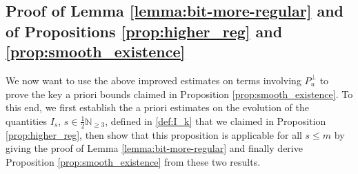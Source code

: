 \documentclass[10pt,reqno]{amsart}
\theoremstyle{plain}
\theoremstyle{definition}
\numberwithin{equation}{section}
\newcommand{\N}{\ensuremath{{\mathbb N}}}
\newcommand{\half}{\frac{1}{2}}
\begin{document}
\subsection{Proof of Lemma \ref{lemma:bit-more-regular} and of 
Propositions \ref{prop:higher_reg} and \ref{prop:smooth_existence}}\label{subsec:higher_reg_est}
We now want to use the above improved estimates on terms involving $P_u^\perp$ to 
prove the key a priori bounds claimed in Proposition \ref{prop:smooth_existence}. To this end, we first establish the 
a priori estimates on the evolution of the quantities $I_{s}$, $s\in \half \N_{\geq 3}$, defined in \eqref{def:I_k} that we claimed in Proposition \ref{prop:higher_reg}, then show that this proposition is applicable for all $s\leq m$ by giving the proof of Lemma \ref{lemma:bit-more-regular} and finally derive Proposition \ref{prop:smooth_existence} from these two results. 
\end{document}
